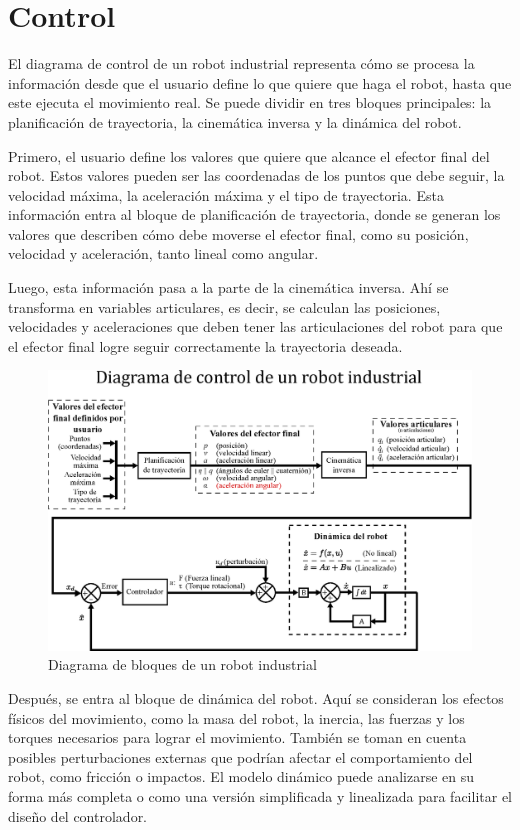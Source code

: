 \section{Control}
El diagrama de control de un robot industrial representa cómo se procesa la información desde que el usuario define lo que quiere que haga el robot, hasta que este ejecuta el movimiento real. Se puede dividir en tres bloques principales: la planificación de trayectoria, la cinemática inversa y la dinámica del robot.

Primero, el usuario define los valores que quiere que alcance el efector final del robot. Estos valores pueden ser las coordenadas de los puntos que debe seguir, la velocidad máxima, la aceleración máxima y el tipo de trayectoria. Esta información entra al bloque de planificación de trayectoria, donde se generan los valores que describen cómo debe moverse el efector final, como su posición, velocidad y aceleración, tanto lineal como angular.

Luego, esta información pasa a la parte de la cinemática inversa. Ahí se transforma en variables articulares, es decir, se calculan las posiciones, velocidades y aceleraciones que deben tener las articulaciones del robot para que el efector final logre seguir correctamente la trayectoria deseada.



\begin{figure}[h]
	\centering
	\includegraphics[width=\linewidth]{img/Diagrama_robot_industrial}
	\caption{Diagrama de bloques de un robot industrial}
	\label{fig:diagrama-de-robot-industrial}
\end{figure}

Después, se entra al bloque de dinámica del robot. Aquí se consideran los efectos físicos del movimiento, como la masa del robot, la inercia, las fuerzas y los torques necesarios para lograr el movimiento. También se toman en cuenta posibles perturbaciones externas que podrían afectar el comportamiento del robot, como fricción o impactos. El modelo dinámico puede analizarse en su forma más completa o como una versión simplificada y linealizada para facilitar el diseño del controlador.

